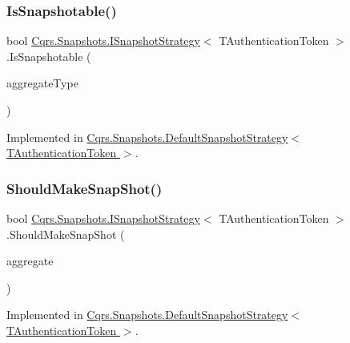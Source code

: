 \subsubsection{\texorpdfstring{Is\+Snapshotable()}{IsSnapshotable()}}
{\footnotesize\ttfamily bool \hyperlink{interfaceCqrs_1_1Snapshots_1_1ISnapshotStrategy}{Cqrs.\+Snapshots.\+I\+Snapshot\+Strategy}$<$ T\+Authentication\+Token $>$.Is\+Snapshotable (\begin{DoxyParamCaption}\item[{Type}]{aggregate\+Type }\end{DoxyParamCaption})}



Implemented in \hyperlink{classCqrs_1_1Snapshots_1_1DefaultSnapshotStrategy_aea1e973d654aaee6f620543be7343fda}{Cqrs.\+Snapshots.\+Default\+Snapshot\+Strategy$<$ T\+Authentication\+Token $>$}.

\mbox{\label{interfaceCqrs_1_1Snapshots_1_1ISnapshotStrategy_ab1d54cd76c7ac832329cb3a6de0effcd}} 
\subsubsection{\texorpdfstring{Should\+Make\+Snap\+Shot()}{ShouldMakeSnapShot()}}
{\footnotesize\ttfamily bool \hyperlink{interfaceCqrs_1_1Snapshots_1_1ISnapshotStrategy}{Cqrs.\+Snapshots.\+I\+Snapshot\+Strategy}$<$ T\+Authentication\+Token $>$.Should\+Make\+Snap\+Shot (\begin{DoxyParamCaption}\item[{\hyperlink{interfaceCqrs_1_1Domain_1_1IAggregateRoot}{I\+Aggregate\+Root}$<$ T\+Authentication\+Token $>$}]{aggregate }\end{DoxyParamCaption})}



Implemented in \hyperlink{classCqrs_1_1Snapshots_1_1DefaultSnapshotStrategy_a59ee11e5c488a40933685e232661df39}{Cqrs.\+Snapshots.\+Default\+Snapshot\+Strategy$<$ T\+Authentication\+Token $>$}.

